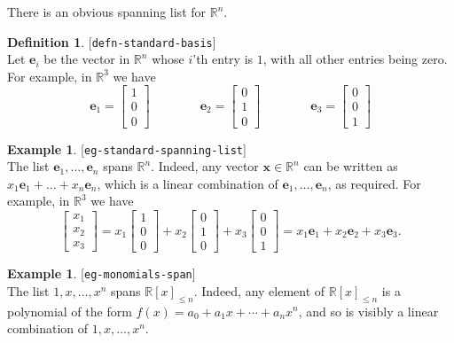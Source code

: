 \documentclass{amsart}
\newcommand{\lbl}[1]{\label{#1}\textup{[\texttt{#1}]}\ \\}
\newcommand{\lbl}{\label}
\newcommand{\R}         {{\mathbb{R}}}
\newcommand{\bsm}       {\left[\begin{smallmatrix}}
\newcommand{\esm}       {\end{smallmatrix}\right]}
\newcommand{\ve}        {\mathbf{e}}
\newcommand{\vx}        {\mathbf{x}}
\renewcommand{\:}       {\colon}
\theoremstyle{definition}
\newtheorem{definition}[theorem]{Definition}
\newtheorem{example}[theorem]{Example}
\begin{document}
There is an obvious spanning list for $\R^n$.
\begin{definition}\lbl{defn-standard-basis}
 Let $\ve_i$ be the vector in $\R^n$ whose $i$'th entry is
 $1$, with all other entries being zero.  For example, in
 $\R^3$ we have
 \[ \ve_1 = \bsm 1\\ 0\\ 0\esm \hspace{4em}
    \ve_2 = \bsm 0\\ 1\\ 0\esm \hspace{4em}
    \ve_3 = \bsm 0\\ 0\\ 1\esm
 \]
\end{definition}

\begin{example}\lbl{eg-standard-spanning-list}
 The list $\ve_1,\dotsc,\ve_n$ spans $\R^n$.  Indeed, any
 vector $\vx\in\R^n$ can be written as
 $x_1\ve_1+\dotsc+x_n\ve_n$, which is a linear combination
 of $\ve_1,\dots,\ve_n$, as required.  For example, in
 $\R^3$ we have 
 \[ \bsm x_1\\ x_2\\ x_3\esm = 
    x_1 \bsm 1 \\ 0 \\ 0 \esm + 
    x_2 \bsm 0 \\ 1 \\ 0 \esm + 
    x_3 \bsm 0 \\ 0 \\ 1 \esm  = 
    x_1\ve_1 + x_2\ve_2 + x_3\ve_3.
 \] 
\end{example}

\begin{example}\lbl{eg-monomials-span}
 The list $1,x,\dotsc,x^n$ spans $\R[x]_{\leq n}$.  Indeed,
 any element of $\R[x]_{\leq n}$ is a polynomial of the form
 $f(x)=a_0+a_1x+\dotsb+a_nx^n$, and so is visibly a linear
 combination of $1,x,\dotsc,x^n$.
\end{example}
\end{document}
